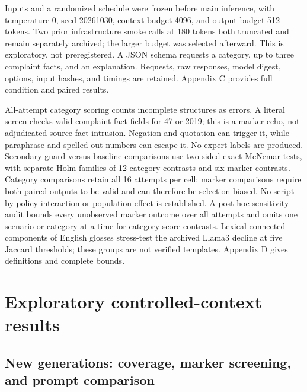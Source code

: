 \documentclass[manuscript,screen,review,anonymous]{acmart}
\begin{document}
Inputs and a randomized schedule were frozen before main inference, with temperature 0, seed 20261030, context budget 4096, and output budget 512 tokens. Two prior infrastructure smoke calls at 180 tokens both truncated and remain separately archived; the larger budget was selected afterward. This is exploratory, not preregistered. A JSON schema requests a category, up to three complaint facts, and an explanation. Requests, raw responses, model digest, options, input hashes, and timings are retained. Appendix C provides full condition and paired results.

All-attempt category scoring counts incomplete structures as errors. A literal screen checks valid complaint-fact fields for 47 or 2019; this is a marker echo, not adjudicated source-fact intrusion. Negation and quotation can trigger it, while paraphrase and spelled-out numbers can escape it. No expert labels are produced. Secondary guard-versus-baseline comparisons use two-sided exact McNemar tests, with separate Holm families of 12 category contrasts and six marker contrasts. Category comparisons retain all 16 attempts per cell; marker comparisons require both paired outputs to be valid and can therefore be selection-biased. No script-by-policy interaction or population effect is established. A post-hoc sensitivity audit bounds every unobserved marker outcome over all attempts and omits one scenario or category at a time for category-score contrasts. Lexical connected components of English glosses stress-test the archived Llama3 decline at five Jaccard thresholds; these groups are not verified templates. Appendix D gives definitions and complete bounds.

\section{Exploratory controlled-context results}

\subsection{New generations: coverage, marker screening, and prompt comparison}
\end{document}
